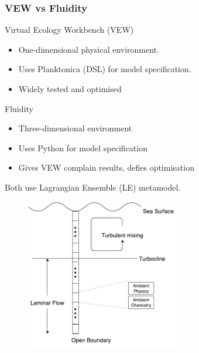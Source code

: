 \documentclass[t]{beamer}
\begin{document}
\begin{frame}
\frametitle{VEW vs Fluidity}
\Large Virtual Ecology Workbench (VEW) \normalsize
\begin{itemize}
	\item One-dimensional physical environment.
	\item Uses Planktonica (DSL) for model specification.
	\item Widely tested and optimised
\end{itemize}
\vspace{12pt}
\Large Fluidity \normalsize
\begin{itemize}
	\item Three-dimensional environment
	\item Uses Python for model specification
	\item Gives VEW complain results, defies optimisation
\end{itemize}
\Large Both use Lagrangian Ensemble (LE) metamodel.



\end{frame}


\begin{frame}[c]

\begin{figure}[H]
  \begin{center}
    \includegraphics[width=0.6\textwidth,natwidth=473,natheight=466]{images/env-diagram.pdf}
  \end{center}
\end{figure}

\end{frame}
\end{document}
